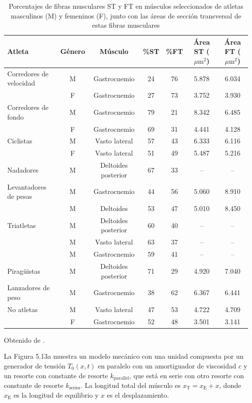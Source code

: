 \documentclass[12pt]{book}
\begin{document}
\begin{table}[htbp]
\centering\footnotesize
\caption{Porcentajes de fibras musculares ST y FT en músculos seleccionados de atletas masculinos (M) y femeninos (F), junto con las áreas de sección transversal de estas fibras musculares}
\label{tab:58}
\begin{tabularx}{\textwidth}{Xcccccc}
\toprule
\textbf{Atleta} & \textbf{Género} & \textbf{Músculo} & \textbf{\%ST} & \textbf{\%FT} & \textbf{Área ST ($\mu\text{m}^2$)} & \textbf{Área FT ($\mu\text{m}^2$)} \\
\midrule
Corredores de velocidad & M & Gastrocnemio & 24 & 76 & 5.878 & 6.034 \\
 & F & Gastrocnemio & 27 & 73 & 3.752 & 3.930 \\
Corredores de fondo & M & Gastrocnemio & 79 & 21 & 8.342 & 6.485 \\
 & F & Gastrocnemio & 69 & 31 & 4.441 & 4.128 \\
Ciclistas & M & Vasto lateral & 57 & 43 & 6.333 & 6.116 \\
 & F & Vasto lateral & 51 & 49 & 5.487 & 5.216 \\
Nadadores & M & Deltoides posterior & 67 & 33 & -- & -- \\
Levantadores de pesas & M & Gastrocnemio & 44 & 56 & 5.060 & 8.910 \\
 & M & Deltoides & 53 & 47 & 5.010 & 8.450 \\
Triatletas & M & Deltoides posterior & 60 & 40 & -- & -- \\
 & M & Vasto lateral & 63 & 37 & -- & -- \\
 & M & Gastrocnemio & 59 & 41 & -- & -- \\
Piragüistas & M & Deltoides posterior & 71 & 29 & 4.920 & 7.040 \\
Lanzadores de peso & M & Gastrocnemio & 38 & 62 & 6.367 & 6.441 \\
No atletas & M & Vasto lateral & 47 & 53 & 4.722 & 4.709 \\
 & F & Gastrocnemio & 52 & 48 & 3.501 & 3.141 \\
\bottomrule
\end{tabularx}
\begin{flushleft}
    \small Obtenido de \cite{80}.
\end{flushleft}
\end{table}

La Figura 5.13a muestra un modelo mecánico con una unidad compuesta por un generador de tensión $T_0(x, t)$ en paralelo con un amortiguador de viscosidad $c$ y un resorte con constante de resorte $k_{\text{parallel}}$, que está en serie con otro resorte con constante de resorte $k_{\text{series}}$. La longitud total del músculo es $x_{\text{T}} = x_{\text{E}} + x$, donde $x_{\text{E}}$ es la longitud de equilibrio y $x$ es el desplazamiento.
\end{document}
